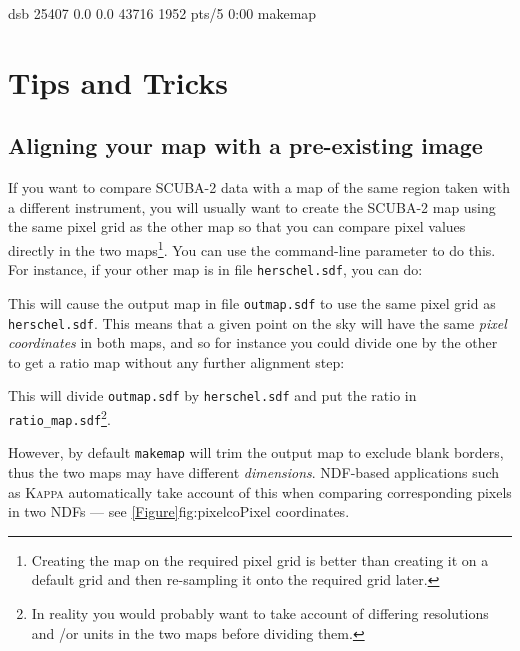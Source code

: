 \begin{terminalv}
\begin{tip}
\begin{terminalv}

dsb      25407  0.0  0.0  43716  1952 pts/5    0:00 makemap

\end{terminalv}

\end{tip}


\section{Tips and Tricks}
\subsection{Aligning your map with a pre-existing image}
If you want to compare SCUBA-2 data with a map of the same region taken
with a different instrument, you will usually want to create the
SCUBA-2 map using the same pixel grid as the other map so that you can
compare pixel values directly in the two maps\footnote{Creating the map on the
required pixel grid is better than creating it on a default grid and then
re-sampling it onto the required grid later.}. You can use the
 command-line parameter to do this. For instance, if your
other map is in file \texttt{herschel.sdf}, you can do:

\begin{terminalv}
\end{terminalv}

This will cause the output map in file \texttt{outmap.sdf} to use
the same pixel grid as \texttt{herschel.sdf}.  This means that a given
point on the sky will have the same \emph{pixel coordinates} in both
maps, and so for instance you could divide one by the other to get a
ratio map without any further alignment step:

\begin{terminalv}
\end{terminalv}

This will divide \texttt{outmap.sdf} by \texttt{herschel.sdf} and put the
ratio in \texttt{ratio\_map.sdf}\footnote{In reality you would probably
want to take account of differing resolutions and /or units in the two
maps before dividing them.}.

However, by default \texttt{makemap} will trim the output map to
exclude blank borders, thus the two maps may have different
\emph{dimensions}. NDF-based applications such as \textsc{Kappa}
 automatically take account of this when
comparing corresponding pixels in two NDFs --- see
\cref{Figure}{fig:pixelco}{Pixel coordinates}.


\end{terminalv}
